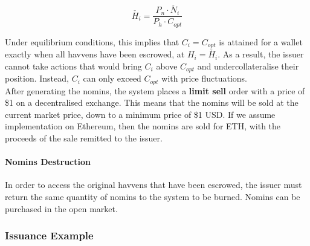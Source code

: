 $$ \check{H_i} = \frac{P_n \cdot \check{N_i}}{P_h \cdot C_{opt}}$$

\noindent Under equilibrium conditions, this implies that $C_i = C_{opt}$ is attained for a wallet exactly when all havvens have been escrowed, at $H_i = \check{H_i}$. As a result, the issuer cannot take actions that would bring $C_i$ above $C_{opt}$ and undercollateralise their position. Instead, $C_i$ can only exceed $C_{opt}$ with price fluctuations. \\

\noindent After generating the nomins, the system places a \textbf{limit sell} order with a price of \$1 on a decentralised exchange. This means that the nomins will be sold at the current market price, down to a minimum price of \$1 USD. If we assume implementation on Ethereum, then the nomins are sold for ETH, with the proceeds of the sale remitted to the issuer.

\paragraph{Nomins Destruction}

\noindent In order to access the original havvens that have been escrowed, the issuer must return the same quantity of nomins to the system to be burned. Nomins can be purchased in the open market.

\subsubsection{Issuance Example}

